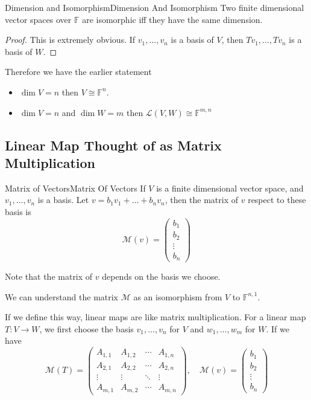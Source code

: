 \documentclass[../main.tex]{subfiles}
\begin{document}
\begin{theorem}{Dimension and Isomorphism}{Dimension And Isomorphism}
Two finite dimensional vector spaces over $\mathbb{F}$ are isomorphic iff they have the same dimension.
\end{theorem}
\begin{proof}
This is extremely obvious. If $v_1, \ldots ,v_n$ is a basis of $V$, then $Tv_1, \ldots ,Tv_n$ is a basis of $W$.
\end{proof}

Therefore we have the earlier statement
\begin{itemize}
\item  $\dim V=n$ then $V\cong \mathbb{F}^n$.
\item $\dim V=n$ and $\dim W=m$ then $\mathscr{L}(V,W)\cong \mathbb{F}^{m,n}$
\end{itemize}


\subsection{Linear Map Thought of as Matrix Multiplication}
\begin{definition}{Matrix of Vectors}{Matrix Of Vectors}
If $V$ is a finite dimensional vector space, and $v_1, \ldots ,v_n$ is a basis.  Let $v= b_1v_1+\ldots +b_nv_n$, then the matrix of $v$ respect to these basis is
\begin{equation}
	\mathscr{M}(v) = 
\begin{pmatrix}
b_1\\b_2\\\vdots \\b_n
\end{pmatrix}
\end{equation}
\end{definition}

Note that the matrix of $v$ depends on the basis we choose.
\begin{remark}
We can understand the matrix $\mathscr{M}$ as an isomorphism from $V$ to $\mathbb{F}^{n,1}$.
\end{remark}

If we define this way, linear maps are like matrix multiplication. For a linear map $T: V \rightarrow W$, we first choose the basis $v_1, \ldots ,v_n$ for $V$ and $w_1, \ldots ,w_m$ for $W$. If we have
\begin{equation*}
\mathscr{M}(T) = 
\begin{pmatrix}
A_{1,1} & A_{1,2} & \cdots & A_{1,n}\\
A_{2,1} & A_{2,2} & \cdots & A_{2,n}\\
\vdots & \vdots & \ddots & \vdots \\
A_{m,1} & A_{m,2} & \cdots & A_{m,n}
\end{pmatrix}
, \quad
\mathscr{M}(v)= 
\begin{pmatrix}
b_1\\b_2\\\vdots \\b_n
\end{pmatrix}
\end{equation*}
\end{document}
